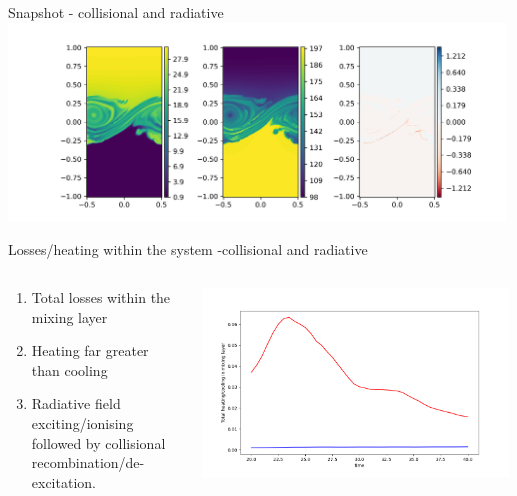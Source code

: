 \documentclass[10pt,aspectratio=169,usenames,dvipsnames]{beamer}
\begin{document}
\begin{frame}{Snapshot - collisional and radiative}
\includegraphics[width=0.99\textwidth]{2023Mixing/Figures/KHInlev_testplot2_rad.png}
\end{frame}

\begin{frame}{Losses/heating within the system -collisional  and radiative}
\begin{columns}
\begin{column}{0.5\textwidth}
\begin{enumerate}
\item Total losses within the mixing layer
\item Heating far greater than cooling
\item Radiative field exciting/ionising followed by collisional recombination/de-excitation.
\end{enumerate}
\end{column}
\begin{column}{0.5\textwidth}
\includegraphics[width=0.99\textwidth]{2023Mixing/Figures/KHInlev_losstimeplot_rad.png}
\end{column}
\end{columns}
\end{frame}
\end{document}

